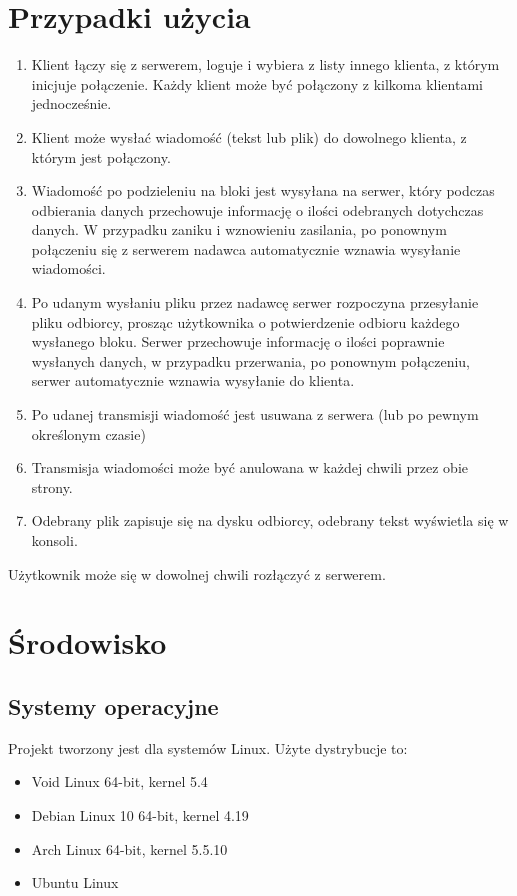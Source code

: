 \documentclass{article}
\begin{document}
\section{Przypadki użycia\label{przyp}}

\begin{enumerate}
\item Klient łączy się z serwerem, loguje i wybiera z listy innego klienta, z którym inicjuje połączenie.
Każdy klient może być połączony z kilkoma klientami jednocześnie.
\item Klient może wysłać wiadomość (tekst lub plik) do dowolnego klienta, z którym jest połączony.
\item Wiadomość po podzieleniu na bloki jest wysyłana na serwer, który podczas odbierania danych przechowuje informację o ilości odebranych dotychczas danych. W przypadku zaniku i wznowieniu zasilania, po ponownym połączeniu się z serwerem nadawca automatycznie wznawia wysyłanie wiadomości.
\item Po udanym wysłaniu pliku przez nadawcę serwer rozpoczyna przesyłanie pliku odbiorcy, prosząc użytkownika o potwierdzenie odbioru każdego wysłanego bloku. Serwer przechowuje informację o ilości poprawnie wysłanych danych, w przypadku przerwania, po ponownym połączeniu, serwer automatycznie wznawia wysyłanie do klienta.
\item Po udanej transmisji wiadomość jest usuwana z serwera (lub po pewnym określonym czasie)
\item Transmisja wiadomości może być anulowana w każdej chwili przez obie strony. 
\item Odebrany plik zapisuje się na dysku odbiorcy, odebrany tekst wyświetla się w konsoli.
\end{enumerate}

Użytkownik może się w dowolnej chwili rozłączyć z serwerem.

\section{Środowisko\label{srod}}

\subsection{Systemy operacyjne}

Projekt tworzony jest dla systemów Linux. Użyte dystrybucje to:
\begin{itemize}

\item Void Linux 64-bit, kernel 5.4
\item Debian Linux 10 64-bit, kernel 4.19
\item Arch Linux 64-bit, kernel 5.5.10
\item Ubuntu Linux

\end{itemize}
\end{document}
